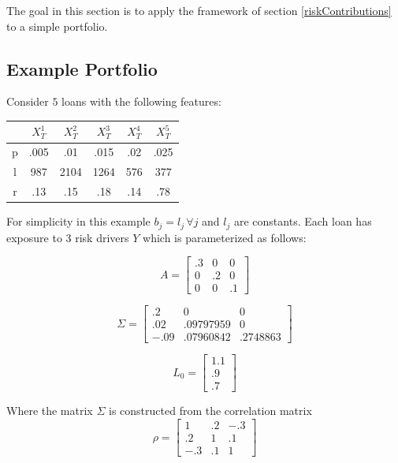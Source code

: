 \documentclass[12pt]{article}
\theoremstyle{definition}
\begin{document}
The goal in this section is to apply the framework of section \ref{riskContributions} to a simple portfolio.  

\subsection{Example Portfolio}
Consider \(5\) loans with the following features:

\begin{table}[H]
\centering
\begin{tabular}{cccccc}
&\(X_T^1\) & \(X_T^2\)& \(X_T^3\)& \(X_T^4\)& \(X_T^5\) \\
\hline
p& .005 & .01& .015& .02& .025 \\
l & 987 &2104 & 1264 & 576 &377 \\
r & .13 & .15 & .18 & .14 & .78 \\
\end{tabular}
\end{table}

For simplicity in this example \(b_j=l_j\, \forall j\) and \(l_j\) are constants.  Each loan has exposure to 3 risk drivers \(Y\) which is parameterized as follows:

\begin{equation}
{A}=\left[ \begin{array}{ccc} .3 & 0& 0 \\ 0 & .2 & 0 \\ 0 & 0 & .1 \end{array} \right]
\end{equation}

\begin{equation}
{\Sigma}=\left[\begin{array}{ccc} .2 & 0 & 0 \\ .02 & .09797959 & 0 \\ -.09 & .07960842 & .2748863 \end{array}\right]
\end{equation}

\begin{equation}
{L}_0=\left[ \begin{array}{c}1.1\\.9\\.7 \end{array} \right]
\end{equation}

Where the matrix \({\Sigma}\) is constructed from the correlation matrix
\begin{equation}
{\rho}=\left[\begin{array}{ccc} 1 & .2 & -.3 \\ .2 & 1 & .1 \\ -.3 & .1 & 1 \end{array}\right]
\end{equation}
\end{document}
